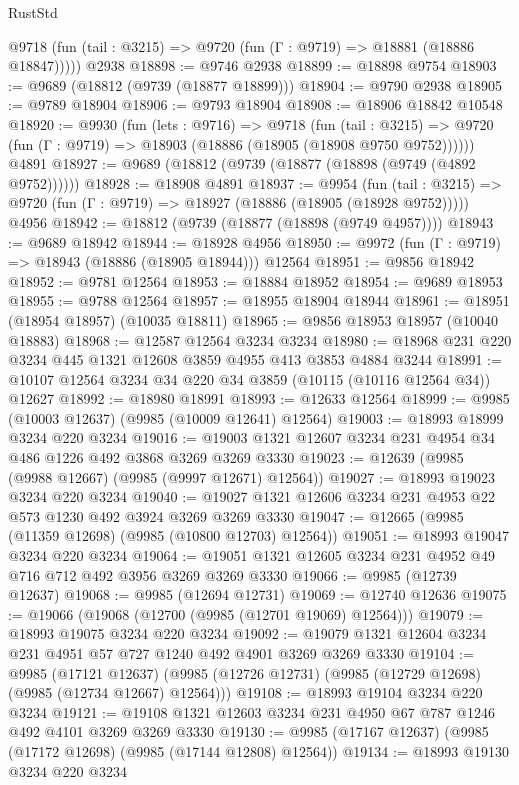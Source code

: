 \begin{lexlean}{RustStd}
\begin{coremodule}
      @9718 (fun (tail : @3215) => @9720 (fun (Γ : @9719) => @18881 (@18886 @18847)))))
    @2938
@18898 := @9746 @2938
@18899 := @18898 @9754
@18903 := @9689 (@18812 (@9739 (@18877 @18899)))
@18904 := @9790 @2938
@18905 := @9789 @18904
@18906 := @9793 @18904
@18908 := @18906 @18842 @10548
@18920 := @9930
    (fun (lets : @9716) =>
    @9718
      (fun (tail : @3215) =>
      @9720 (fun (Γ : @9719) => @18903 (@18886 (@18905 (@18908 @9750 @9752))))))
    @4891
@18927 := @9689 (@18812 (@9739 (@18877 (@18898 (@9749 (@4892 @9752))))))
@18928 := @18908 @4891
@18937 := @9954
    (fun (tail : @3215) => @9720 (fun (Γ : @9719) => @18927 (@18886 (@18905 (@18928 @9752)))))
    @4956
@18942 := @18812 (@9739 (@18877 (@18898 (@9749 @4957))))
@18943 := @9689 @18942
@18944 := @18928 @4956
@18950 := @9972 (fun (Γ : @9719) => @18943 (@18886 (@18905 @18944))) @12564
@18951 := @9856 @18942
@18952 := @9781 @12564
@18953 := @18884 @18952
@18954 := @9689 @18953
@18955 := @9788 @12564
@18957 := @18955 @18904 @18944
@18961 := @18951 (@18954 @18957) (@10035 @18811)
@18965 := @9856 @18953 @18957 (@10040 @18883)
@18968 := @12587 @12564 @3234 @3234
@18980 := @18968 @231 @220 @3234 @445 @1321 @12608 @3859 @4955 @413 @3853 @4884 @3244
@18991 := @10107 @12564 @3234 @34 @220 @34 @3859 (@10115 (@10116 @12564 @34)) @12627
@18992 := @18980 @18991
@18993 := @12633 @12564
@18999 := @9985 (@10003 @12637) (@9985 (@10009 @12641) @12564)
@19003 := @18993 @18999 @3234 @220 @3234
@19016 := @19003 @1321 @12607 @3234 @231 @4954 @34 @486 @1226 @492 @3868 @3269 @3269 @3330
@19023 := @12639 (@9985 (@9988 @12667) (@9985 (@9997 @12671) @12564))
@19027 := @18993 @19023 @3234 @220 @3234
@19040 := @19027 @1321 @12606 @3234 @231 @4953 @22 @573 @1230 @492 @3924 @3269 @3269 @3330
@19047 := @12665 (@9985 (@11359 @12698) (@9985 (@10800 @12703) @12564))
@19051 := @18993 @19047 @3234 @220 @3234
@19064 := @19051 @1321 @12605 @3234 @231 @4952 @49 @716 @712 @492 @3956 @3269 @3269 @3330
@19066 := @9985 (@12739 @12637)
@19068 := @9985 (@12694 @12731)
@19069 := @12740 @12636
@19075 := @19066 (@19068 (@12700 (@9985 (@12701 @19069) @12564)))
@19079 := @18993 @19075 @3234 @220 @3234
@19092 := @19079 @1321 @12604 @3234 @231 @4951 @57 @727 @1240 @492 @4901 @3269 @3269 @3330
@19104 := @9985
    (@17121 @12637)
    (@9985 (@12726 @12731) (@9985 (@12729 @12698) (@9985 (@12734 @12667) @12564)))
@19108 := @18993 @19104 @3234 @220 @3234
@19121 := @19108 @1321 @12603 @3234 @231 @4950 @67 @787 @1246 @492 @4101 @3269 @3269 @3330
@19130 := @9985 (@17167 @12637) (@9985 (@17172 @12698) (@9985 (@17144 @12808) @12564))
@19134 := @18993 @19130 @3234 @220 @3234

\end{coremodule}
\end{lexlean}
